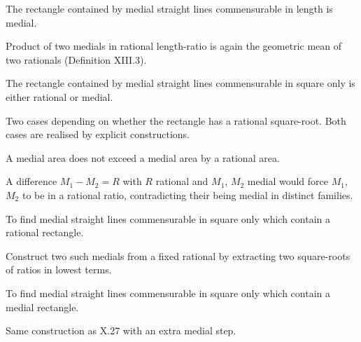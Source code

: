 \begin{claim}
\label{prop:X.24}
The rectangle contained by medial straight lines commensurable in
length is medial.
\end{claim}
\begin{evidence}[Proof of X.24]
\label{ev:X.24}
Product of two medials in rational length-ratio is again the
geometric mean of two rationals (Definition XIII.3).
\end{evidence}

\begin{claim}
\label{prop:X.25}
The rectangle contained by medial straight lines commensurable in
square only is either rational or medial.
\end{claim}
\begin{evidence}[Proof of X.25]
\label{ev:X.25}
Two cases depending on whether the rectangle has a rational
square-root.  Both cases are realised by explicit constructions.
\end{evidence}

\begin{claim}
\label{prop:X.26}
A medial area does not exceed a medial area by a rational area.
\end{claim}
\begin{evidence}[Proof of X.26]
\label{ev:X.26}
A difference $M_1 - M_2 = R$ with $R$ rational and $M_1$, $M_2$
medial would force $M_1$, $M_2$ to be in a rational ratio,
contradicting their being medial in distinct families.
\end{evidence}

\begin{claim}
\label{prop:X.27}
To find medial straight lines commensurable in square only which
contain a rational rectangle.
\end{claim}
\begin{evidence}[Proof of X.27]
\label{ev:X.27}
Construct two such medials from a fixed rational by extracting two
square-roots of ratios in lowest terms.
\end{evidence}

\begin{claim}
\label{prop:X.28}
To find medial straight lines commensurable in square only which
contain a medial rectangle.
\end{claim}
\begin{evidence}[Proof of X.28]
\label{ev:X.28}
Same construction as X.27 with an extra medial step.
\end{evidence}

